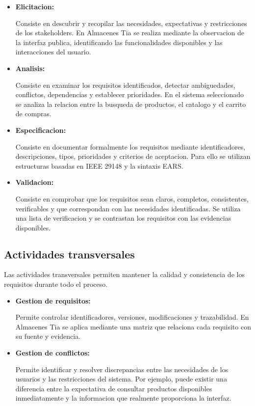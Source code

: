 \documentclass[11pt,a4paper]{article}
\begin{document}
\begin{itemize}

    \item \textbf{Elicitacion:}

    Consiste en descubrir y recopilar las necesidades,
    expectativas y restricciones de los stakeholders.
    En Almacenes Tia se realiza mediante la observacion
    de la interfaz publica, identificando las
    funcionalidades disponibles y las interacciones
    del usuario.

    \item \textbf{Analisis:}

    Consiste en examinar los requisitos identificados,
    detectar ambiguedades, conflictos, dependencias
    y establecer prioridades. En el sistema seleccionado
    se analiza la relacion entre la busqueda de productos,
    el catalogo y el carrito de compras.

    \item \textbf{Especificacion:}

    Consiste en documentar formalmente los requisitos
    mediante identificadores, descripciones, tipos,
    prioridades y criterios de aceptacion. Para ello
    se utilizan estructuras basadas en IEEE 29148
    y la sintaxis EARS.

    \item \textbf{Validacion:}

    Consiste en comprobar que los requisitos sean
    claros, completos, consistentes, verificables
    y que correspondan con las necesidades identificadas.
    Se utiliza una lista de verificacion y se contrastan
    los requisitos con las evidencias disponibles.

\end{itemize}

\subsection{Actividades transversales}

Las actividades transversales permiten mantener
la calidad y consistencia de los requisitos durante
todo el proceso.

\begin{itemize}

    \item \textbf{Gestion de requisitos:}

    Permite controlar identificadores, versiones,
    modificaciones y trazabilidad. En Almacenes Tia
    se aplica mediante una matriz que relaciona
    cada requisito con su fuente y evidencia.

    \item \textbf{Gestion de conflictos:}

    Permite identificar y resolver discrepancias
    entre las necesidades de los usuarios y las
    restricciones del sistema. Por ejemplo, puede
    existir una diferencia entre la expectativa
    de consultar productos disponibles inmediatamente
    y la informacion que realmente proporciona
    la interfaz.

\end{itemize}
\end{document}
